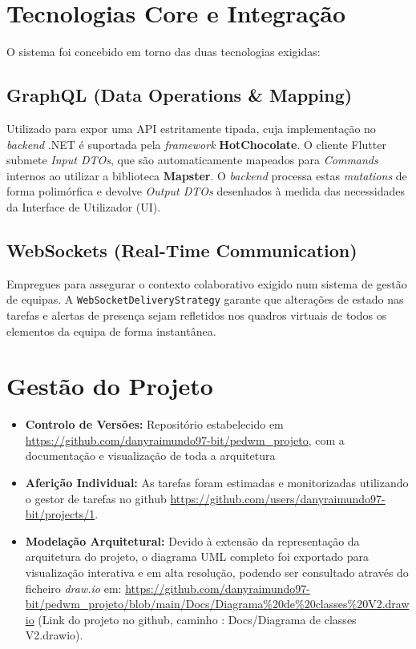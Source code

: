 \documentclass{llncs}
\begin{document}
\section{Tecnologias Core e Integração}
O sistema foi concebido em torno das duas tecnologias exigidas:

\subsection{GraphQL (Data Operations \& Mapping)}
Utilizado para expor uma API estritamente tipada, cuja implementação no \textit{backend} .NET é suportada pela \textit{framework} \textbf{HotChocolate}. O cliente Flutter submete \textit{Input DTOs}, que são automaticamente mapeados para \textit{Commands} internos ao utilizar a biblioteca \textbf{Mapster}. O \textit{backend} processa estas \textit{mutations} de forma polimórfica e devolve \textit{Output DTOs} desenhados à medida das necessidades da Interface de Utilizador (UI).

\subsection{WebSockets (Real-Time Communication)}
Empregues para assegurar o contexto colaborativo exigido num sistema de gestão de equipas. A \texttt{WebSocketDeliveryStrategy} garante que alterações de estado nas tarefas e alertas de presença sejam refletidos nos quadros virtuais de todos os elementos da equipa de forma instantânea.

\section{Gestão do Projeto }
\begin{itemize}
    \item \textbf{Controlo de Versões:} Repositório estabelecido em \url{https://github.com/danyraimundo97-bit/pedwm_projeto}, com a documentação e visualização de toda a arquitetura
    \item \textbf{Aferição Individual:} As tarefas foram estimadas e monitorizadas utilizando o gestor de tarefas no github \url{https://github.com/users/danyraimundo97-bit/projects/1}.
    \item \textbf{Modelação Arquitetural:} Devido à extensão da representação da arquitetura do projeto, o diagrama UML completo foi exportado para visualização interativa e em alta resolução, podendo ser consultado através do ficheiro \textit{draw.io} em: \url{https://github.com/danyraimundo97-bit/pedwm_projeto/blob/main/Docs/Diagrama%20de%20classes%20V2.drawio} (Link do projeto no github, caminho : Docs/Diagrama de classes V2.drawio).
    
\end{itemize}
\end{document}
